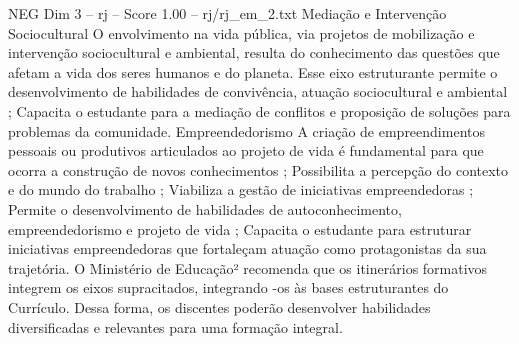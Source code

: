 \begin{textsample}{NEG Dim 3 – rj – Score 1.00 – rj/rj\_em\_2.txt}
Mediação e Intervenção Sociocultural O envolvimento na vida pública, via projetos de mobilização e intervenção sociocultural e ambiental, resulta do conhecimento das questões que afetam a vida dos seres humanos e do planeta.
Esse eixo estruturante permite o desenvolvimento de habilidades de convivência, atuação sociocultural e ambiental ; Capacita o estudante para a mediação de conflitos e proposição de soluções para problemas da comunidade.
Empreendedorismo A criação de empreendimentos pessoais ou produtivos articulados ao projeto de vida é fundamental para que ocorra a construção de novos conhecimentos ; Possibilita a percepção do contexto e do mundo do trabalho ; Viabiliza a gestão de iniciativas empreendedoras ; Permite o desenvolvimento de habilidades de autoconhecimento, empreendedorismo e projeto de vida ; Capacita o estudante para estruturar iniciativas empreendedoras que fortaleçam atuação como protagonistas da sua trajetória.
O Ministério de Educação² recomenda que os itinerários formativos integrem os eixos supracitados, integrando -os às bases estruturantes do Currículo.
Dessa forma, os discentes poderão desenvolver habilidades diversificadas e relevantes para uma formação integral.

\end{textsample}
